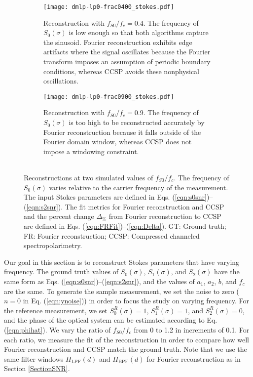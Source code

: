 \documentclass[10pt]{article}
\numberwithin{equation}{subsection}
\begin{document}
\begin{figure}[!htb]
  \label{fig7}
  \begin{subfigure}[b]{0.5\linewidth}
    \centering
    \texttt{[image: dmlp-lp0-frac0400\_stokes.pdf]}
      \caption{Reconstruction with $f_{S0} / f_c = 0.4$.
      The frequency of $S_0(\sigma)$ is low enough so that both algorithms capture the sinusoid.
      Fourier reconstruction exhibits edge artifacts where the signal oscillates because the Fourier transform imposes an assumption of periodic boundary conditions, whereas CCSP avoids these nonphysical oscillations.}
    \label{fig:freq0400}
  \end{subfigure}%
  \begin{subfigure}[b]{0.5\linewidth}
    \centering
    \texttt{[image: dmlp-lp0-frac0900\_stokes.pdf]}
      \caption{Reconstruction with $f_{S0} / f_c = 0.9$.
      The frequency of $S_0(\sigma)$ is too high to be reconstructed accurately by Fourier reconstruction because it falls outside of the Fourier domain window, whereas CCSP does not impose a windowing constraint.\\\\}
    \label{fig:freq0900}
  \end{subfigure}
      \caption{Reconstructions at two simulated values of $f_{S0} / f_c$.
      The frequency of $S_0(\sigma)$ varies relative to the carrier frequency of the measurement.
      The input Stokes parameters are defined in Eqs. (\ref{eqn:s0snr})--(\ref{eqn:s2snr}).
      The fit metrics for Fourier reconstruction and CCSP and the percent change $\Delta_\%$ from Fourier reconstruction to CCSP are defined in Eqs. (\ref{eqn:FRFit})--(\ref{eqn:Delta}).
      GT: Ground truth; FR: Fourier reconstruction; CCSP: Compressed channeled spectropolarimetry.}
  \end{figure}

    Our goal in this section is to reconstruct Stokes parameters that have varying frequency.
    The ground truth values of $S_0(\sigma)$, $S_1(\sigma)$, and $S_2(\sigma)$ have the same form as Eqs. (\ref{eqn:s0snr})--(\ref{eqn:s2snr}), and the values of $a_1$, $a_2$, $b$, and $f_c$ are the same.
    To generate the sample measurement, we set the noise to zero ($n = 0$ in Eq. (\ref{eqn:ynoise})) in order to focus the study on varying frequency.
    For the reference measurement, we set $S_0^R(\sigma) = 1$, $S_1^R(\sigma) = 1$, and $S_2^R(\sigma) = 0$, and the phase of the optical system can be estimated according to Eq. (\ref{eqn:phihat}).
    We vary the ratio of $f_{S0} / f_c$ from 0 to 1.2 in increments of 0.1.
    For each ratio, we measure the fit of the reconstruction in order to compare how well Fourier reconstruction and CCSP match the ground truth.
    Note that we use the same filter windows $H_\text{LPF}(d)$ and $H_\text{BPF}(d)$ for Fourier reconstruction as in Section \ref{SectionSNR}.
\end{document}
